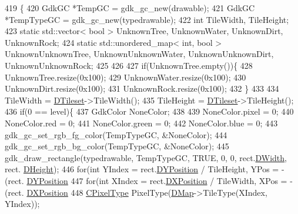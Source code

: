 \begin{DoxyCode}
419                                                                                                            
        \{
420     GdkGC *TempGC = gdk\_gc\_new(drawable);
421     GdkGC *TempTypeGC = gdk\_gc\_new(typedrawable);
422     \textcolor{keywordtype}{int} TileWidth, TileHeight;
423     \textcolor{keyword}{static} std::vector< bool > UnknownTree, UnknownWater, UnknownDirt, UnknownRock;
424     \textcolor{keyword}{static} std::unordered\_map< int, bool > UnknownUnknownTree, UnknownUnknownWater, UnknownUnknownDirt, 
      UnknownUnknownRock;
425     
426     
427     \textcolor{keywordflow}{if}(UnknownTree.empty())\{
428         UnknownTree.resize(0x100);   
429         UnknownWater.resize(0x100);   
430         UnknownDirt.resize(0x100);  
431         UnknownRock.resize(0x100);  
432     \}
433     
434     TileWidth = \hyperlink{classCMapRenderer_ace0648cba050b5e02431096edd15b836}{DTileset}->TileWidth();
435     TileHeight = \hyperlink{classCMapRenderer_ace0648cba050b5e02431096edd15b836}{DTileset}->TileHeight();
436     \textcolor{keywordflow}{if}(0 == level)\{
437         GdkColor NoneColor;
438         
439         NoneColor.pixel = 0;
440         NoneColor.red = 0;
441         NoneColor.green = 0;
442         NoneColor.blue = 0;
443         gdk\_gc\_set\_rgb\_fg\_color(TempTypeGC, &NoneColor);
444         gdk\_gc\_set\_rgb\_bg\_color(TempTypeGC, &NoneColor);
445         gdk\_draw\_rectangle(typedrawable, TempTypeGC, TRUE, 0, 0, rect.\hyperlink{structSRectangle_a4150898b3f7d90f6e4b0d44bf1ae3bd2}{DWidth}, rect.
      \hyperlink{structSRectangle_a84ea3c2314c43cab6186170662188899}{DHeight});
446         \textcolor{keywordflow}{for}(\textcolor{keywordtype}{int} YIndex = rect.\hyperlink{structSRectangle_a120aa0a90033bc6e07c36c151a3bbc71}{DYPosition} / TileHeight, YPos = -(rect.
      \hyperlink{structSRectangle_a120aa0a90033bc6e07c36c151a3bbc71}{DYPosition} %
447             \textcolor{keywordflow}{for}(\textcolor{keywordtype}{int} XIndex = rect.\hyperlink{structSRectangle_abcbddb03b3ee416cc33109833b5f075c}{DXPosition} / TileWidth, XPos = -(rect.
      \hyperlink{structSRectangle_abcbddb03b3ee416cc33109833b5f075c}{DXPosition} %
448                 \hyperlink{classCPixelType}{CPixelType} PixelType(\hyperlink{classCMapRenderer_ab9a199c61aa1c87a3248af3085d8ba52}{DMap}->TileType(XIndex, YIndex)); 

\end{DoxyCode}
